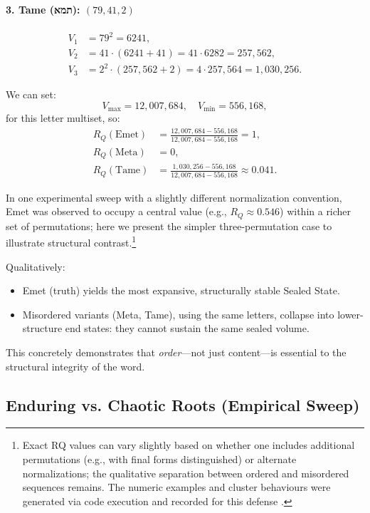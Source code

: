\documentclass[11pt]{article}
\begin{document}
\paragraph{3. Tame (תמא): $(79,41,2)$}
\begin{align*}
V_1 &= 79^2 = 6241,\\
V_2 &= 41 \cdot (6241 + 41) = 41 \cdot 6282 = 257{,}562,\\
V_3 &= 2^2 \cdot (257{,}562 + 2) = 4 \cdot 257{,}564 = 1{,}030{,}256.
\end{align*}

We can set:
\[
V_{\max} = 12{,}007{,}684,\quad V_{\min} = 556{,}168,
\]
for this letter multiset, so:
\begin{align*}
R_Q(\text{Emet}) &= \frac{12{,}007{,}684 - 556{,}168}{12{,}007{,}684 - 556{,}168} = 1,\\
R_Q(\text{Meta}) &= 0,\\
R_Q(\text{Tame}) &= \frac{1{,}030{,}256 - 556{,}168}{12{,}007{,}684 - 556{,}168} \approx 0.041.
\end{align*}

In one experimental sweep with a slightly different normalization convention, Emet was observed to occupy a central value (e.g., $R_Q \approx 0.546$) within a richer set of permutations; here we present the simpler three-permutation case to illustrate structural contrast.\footnote{Exact RQ values can vary slightly based on whether one includes additional permutations (e.g., with final forms distinguished) or alternate normalizations; the qualitative separation between ordered and misordered sequences remains. The numeric examples and cluster behaviours were generated via code execution and recorded for this defense \cite{corruptiontest}.}

Qualitatively:
\begin{itemize}
    \item Emet (truth) yields the most expansive, structurally stable Sealed State.
    \item Misordered variants (Meta, Tame), using the same letters, collapse into lower-structure end states: they cannot sustain the same sealed volume.
\end{itemize}

This concretely demonstrates that \emph{order}---not just content---is essential to the structural integrity of the word.

\subsection{Enduring vs. Chaotic Roots (Empirical Sweep)}
\end{document}
